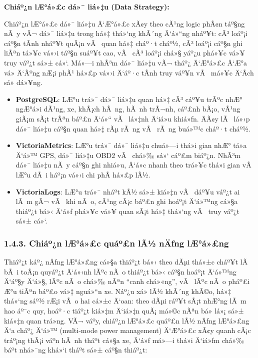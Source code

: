 \documentclass[a4paper]{extarticle}
\providecommand{\tightlist}{%
  \setlength{\itemsep}{0pt}\setlength{\parskip}{0pt}}
\begin{document}
\textbf{Chiáº¿n lÆ°á»£c dá»¯ liá»‡u (Data Strategy):}

Chiáº¿n lÆ°á»£c dá»¯ liá»‡u Ä‘Æ°á»£c xÃ¢y theo cÃ¹ng logic phÃ¢n táº§ng nÃ y vÃ¬ dá»¯ liá»‡u
trong há»‡ thá»‘ng khÃ´ng Ä‘á»“ng nháº¥t: cÃ³ loáº¡i cáº§n tÃ­nh nháº¥t quÃ¡n vÃ  quan há»‡
cháº·t cháº½, cÃ³ loáº¡i cáº§n ghi liÃªn tá»¥c vá»›i táº§n suáº¥t cao, vÃ  cÃ³ loáº¡i chá»§ yáº¿u
phá»¥c vá»¥ truy váº¿t sá»± cá»‘. Má»—i nhÃ³m dá»¯ liá»‡u vÃ¬ tháº¿ Ä‘Æ°á»£c Ä‘Æ°a vá» Ä‘Ãºng nÆ¡i phÃ¹
há»£p vá»›i Ä‘áº·c tÃ­nh truy váº¥n vÃ  má»¥c Ä‘Ã­ch sá»­ dá»¥ng.

\begin{itemize}
\tightlist
\item
  \textbf{PostgreSQL}: LÆ°u trá»¯ dá»¯ liá»‡u quan há»‡ cÃ³ cáº¥u trÃºc nhÆ° ngÆ°á»i
  dÃ¹ng, xe, khÃ¡ch hÃ ng, hÃ nh trÃ¬nh, cáº£nh bÃ¡o, vÃ¹ng giÃ¡m sÃ¡t trÃªn báº£n Ä‘á»“
  vÃ  lá»‡nh Ä‘iá»u khiá»ƒn. ÄÃ¢y lÃ  lá»›p dá»¯ liá»‡u cáº§n quan há»‡ rÃµ rÃ ng vÃ  rÃ ng
  buá»™c cháº·t cháº½.
\item
  \textbf{VictoriaMetrics}: LÆ°u trá»¯ dá»¯ liá»‡u chuá»—i thá»i gian nhÆ° tá»a Ä‘á»™
  GPS, dá»¯ liá»‡u OBD2 vÃ  chá»‰ sá»‘ cáº£m biáº¿n. NhÃ³m dá»¯ liá»‡u nÃ y cáº§n ghi nhiá»u,
  Ä‘á»c nhanh theo trá»¥c thá»i gian vÃ  lÆ°u dÃ i háº¡n vá»›i chi phÃ­ há»£p lÃ½.
\item
  \textbf{VictoriaLogs}: LÆ°u trá»¯ nháº­t kÃ½ sá»± kiá»‡n vÃ  dáº¥u
  váº¿t ai lÃ m gÃ¬ vÃ  khi nÃ o, cÃ¹ng cÃ¡c báº£n
  ghi hoáº¡t Ä‘á»™ng cá»§a thiáº¿t bá»‹ Ä‘á»ƒ phá»¥c vá»¥ quan sÃ¡t há»‡ thá»‘ng vÃ  truy váº¿t sá»±
  cá»‘.
\end{itemize}

\subsubsection{1.4.3. Chiáº¿n lÆ°á»£c quáº£n lÃ½ nÄƒng
lÆ°á»£ng}\label{143-chiux1ebfn-lux1b0ux1ee3c-quux1ea3n-luxfd-nux103ng-lux1b0ux1ee3ng}

Thiáº¿t káº¿ nÄƒng lÆ°á»£ng cá»§a thiáº¿t bá»‹ theo dÃµi thá»±c cháº¥t lÃ  bÃ i toÃ¡n quyáº¿t Ä‘á»‹nh lÃºc nÃ o
thiáº¿t bá»‹ cáº§n hoáº¡t Ä‘á»™ng Ä‘áº§y Ä‘á»§, lÃºc nÃ o chá»‰ nÃªn ``canh chá»«ng'', vÃ  lÃºc nÃ o
pháº£i Æ°u tiÃªn báº£o vá»‡ nguá»“n xe. Náº¿u xá»­ lÃ½ khÃ´ng khÃ©o, há»‡ thá»‘ng sáº½ rÆ¡i vÃ o
hai cá»±c Ä‘oan: theo dÃµi ráº¥t sÃ¡t nhÆ°ng lÃ m hao áº¯c quy, hoáº·c tiáº¿t kiá»‡m Ä‘iá»‡n
quÃ¡ má»©c nÃªn bá» lá»¡ sá»± kiá»‡n quan trá»ng. VÃ¬ váº­y, chiáº¿n lÆ°á»£c quáº£n lÃ½ nÄƒng
lÆ°á»£ng Ä‘a cháº¿ Ä‘á»™ (multi-mode power management) Ä‘Æ°á»£c xÃ¢y quanh cÃ¡c tráº¡ng
thÃ¡i váº­n hÃ nh tháº­t cá»§a xe, Ä‘á»ƒ má»—i thá»i Ä‘iá»ƒm chá»‰ báº­t nhá»¯ng khá»‘i tháº­t sá»±
cáº§n thiáº¿t:
\end{document}
